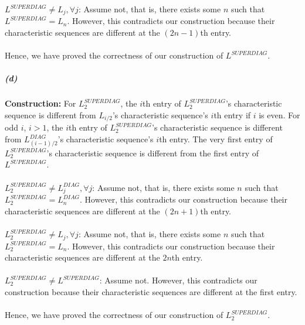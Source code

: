 \documentclass[12pt]{article}
\theoremstyle{definition}
\numberwithin{equation}{section}
\begin{document}
$L^{SUPERDIAG} \neq L_j,\forall j$: Assume not, that is, there exists some $n$ such that $L^{SUPERDIAG} = L_n$. However, this contradicts our construction because their characteristic sequences are different at the $(2n-1)$th entry. \\~\\

Hence, we have proved the correctness of our construction of $L^{SUPERDIAG}$.

\subparagraph{(d)} 
\textbf{Construction:} For $L^{SUPERDIAG}_2$, the $i$th entry of $L^{SUPERDIAG}_2$'s characteristic sequence is different from $L_{i/2}$'s characteristic sequence's $i$th entry if $i$ is even. For odd $i$, $i>1$, the $i$th entry of $L^{SUPERDIAG}_2$'s characteristic sequence is different from $L^{DIAG}_{(i-1)/2}$'s characteristic sequence's $i$th entry. The very first entry of $L^{SUPERDIAG}_2$'s characteristic sequence is different from the first entry of $L^{SUPERDIAG}$.\\~\\

$L^{SUPERDIAG}_2 \neq L^{DIAG}_j,\forall j$: Assume not, that is, there exists some $n$ such that $L^{SUPERDIAG}_2 = L^{DIAG}_n$. However, this contradicts our construction because their characteristic sequences are different at the $(2n+1)$th entry. \\~\\

$L^{SUPERDIAG}_2 \neq L_j,\forall j$: Assume not, that is, there exists some $n$ such that $L^{SUPERDIAG}_2 = L_n$. However, this contradicts our construction because their characteristic sequences are different at the $2n$th entry. \\~\\

$L^{SUPERDIAG}_2 \neq L^{SUPERDIAG}$: Assume not. However, this contradicts our construction because their characteristic sequences are different at the first entry. \\~\\

Hence, we have proved the correctness of our construction of $L^{SUPERDIAG}_2$.
\end{document}
